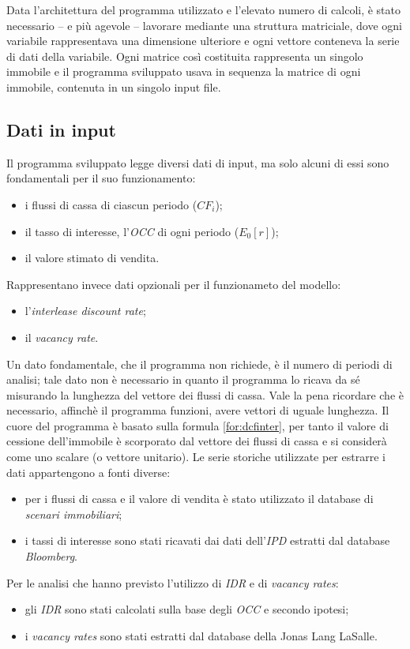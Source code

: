 Data l'architettura del programma utilizzato e l'elevato numero di calcoli, è stato necessario -- e più agevole -- lavorare mediante una struttura matriciale, dove ogni variabile rappresentava una dimensione ulteriore e ogni vettore conteneva la serie di dati della variabile. Ogni matrice così costituita rappresenta un singolo immobile e il programma sviluppato usava in sequenza la matrice di ogni immobile, contenuta in un singolo input file.

\subsection{Dati in input}
\label{subs:datiinput}
Il programma sviluppato legge diversi dati di input, ma solo alcuni di essi sono fondamentali per il suo funzionamento:
\begin{itemize}
\item i flussi di cassa di ciascun periodo ($CF_i$);
\item il tasso di interesse, l'\textit{OCC} di ogni periodo ($E_0[r]$);
\item il valore stimato di vendita.
\end{itemize}
Rappresentano invece dati opzionali per il funzionameto del modello:
\begin{itemize}
\item l'{\itshape interlease discount rate};
\item il {\itshape vacancy rate}.
\end{itemize}
Un dato fondamentale, che il programma non richiede, è il numero di periodi di analisi; tale dato non è necessario in quanto il programma lo ricava da sé misurando la lunghezza del vettore dei flussi di cassa. Vale la pena ricordare che è necessario, affinchè il programma funzioni, avere vettori di uguale lunghezza.
Il cuore del programma è basato sulla formula \ref{for:dcfinter}, per tanto il valore di cessione dell'immobile è scorporato dal vettore dei flussi di cassa e si considerà come uno scalare (o vettore unitario).
Le serie storiche utilizzate per estrarre i dati appartengono a fonti diverse:
\begin{itemize}
\item per i flussi di cassa e il valore di vendita è stato utilizzato il database di {\itshape scenari immobiliari};
\item i tassi di interesse sono stati ricavati dai dati dell'{\itshape IPD} estratti dal database {\itshape Bloomberg}.
\end{itemize}
Per le analisi che hanno previsto l'utilizzo di \textit{IDR} e di {\itshape vacancy rates}:
\begin{itemize}
\item gli \textit{IDR} sono stati calcolati sulla base degli \textit{OCC} e secondo ipotesi;
\item i {\itshape vacancy rates} sono stati estratti dal database della Jonas Lang LaSalle.
\end{itemize}

